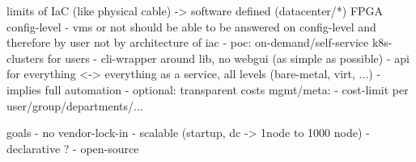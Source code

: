 limits of IaC (like physical cable) -> software defined (datacenter/*)
FPGA
config-level
- vms or not should be able to be answered on config-level and therefore by user not by architecture of iac
- poc: on-demand/self-service k8s-clusters for users
  - cli-wrapper around lib, no webgui (as simple as possible)
  - api for everything <-> everything as a service, all levels (bare-metal, virt, ...)
  - implies full automation
  - optional: transparent costs
mgmt/meta:
- cost-limit per user/group/departments/...

goals
- no vendor-lock-in
- scalable (startup, dc -> 1node to 1000 node)
- declarative ?
- open-source
